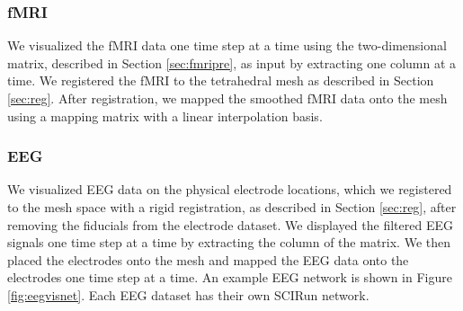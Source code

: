 \subsubsection{fMRI}

We visualized the fMRI data one time step at a time using the two-dimensional matrix, described in Section \ref{sec:fmripre}, as input by extracting one column at a time. We registered the fMRI to the tetrahedral mesh as described in Section \ref{sec:reg}. After registration, we mapped the smoothed fMRI data onto the mesh using a mapping matrix with a linear interpolation basis.

\subsubsection{EEG}

We visualized EEG data on the physical electrode locations, which we registered to the mesh space with a rigid registration, as described in Section \ref{sec:reg}, after removing the fiducials from the electrode dataset. We displayed the filtered EEG signals one time step at a time by extracting the column of the matrix. We then placed the electrodes onto the mesh and mapped the EEG data onto the electrodes one time step at a time. An example EEG network is shown in Figure \ref{fig:eegvisnet}. Each EEG dataset has their own SCIRun network.

